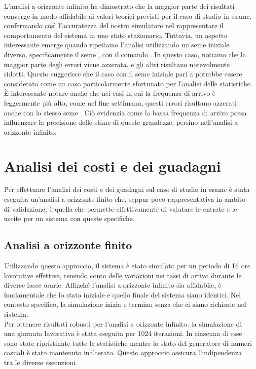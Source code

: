 \documentclass[a4paper, 12pt]{article}
\newcommand{\key}[1]{\texttt{\StrSubstitute{#1}{_}{\_}}}
\begin{document}
L'analisi a orizzonte infinito ha dimostrato che la maggior parte dei risultati converge in modo affidabile ai valori teorici previsti per il caso di studio in esame, confermando così l'accuratezza del nostro simulatore nel rappresentare il comportamento del sistema in uno stato stazionario. Tuttavia, un aspetto interessante emerge quando ripetiamo l'analisi utilizzando un seme iniziale diverso, specificamente il seme \key{12345}, con il comando \key{make clean infinite-weekend SEED=12345}. In questo caso, notiamo che la maggior parte degli errori viene azzerata, e gli altri risultano notevolmente ridotti. Questo suggerisce che il caso con il seme iniziale pari a \key{123} potrebbe essere considerato come un caso particolarmente sfortunato per l'analisi delle statistiche.\\

È interessante notare anche che nei casi in cui la frequenza di arrivo è leggermente più alta, come nel fine settimana, questi errori risultano azzerati anche con lo stesso seme \key{123}. Ciò evidenzia come la bassa frequenza di arrivo possa influenzare la precisione delle stime di queste grandezze, persino nell'analisi a orizzonte infinito. 

\section{Analisi dei costi e dei guadagni}
Per effettuare l'analisi dei costi e dei guadagni sul caso di studio in esame è stata eseguita un'analisi a orizzonte finito che, seppur poco rappresentativa in ambito di validazione, è quella che permette effettivamente di valutare le entrate e le uscite per un sistema con queste specifiche. 

\subsection{Analisi a orizzonte finito}
Utilizzando questo approccio, il sistema è stato simulato per un periodo di 16 ore lavorative effettive, tenendo conto delle variazioni nei tassi di arrivo durante le diverse fasce orarie. Affinché l'analisi a orizzonte infinito sia affidabile, è fondamentale che lo stato iniziale e quello finale del sistema siano identici. Nel contesto specifico, la simulazione inizia e termina senza che ci siano richieste nel sistema.\\

Per ottenere risultati robusti per l'analisi a orizzonte infinito, la simulazione di una giornata lavorativa è stata eseguita per 1024 iterazioni. In ciascuna di esse sono state ripristinate tutte le statistiche mentre lo stato del generatore di numeri casuali è stato mantenuto inalterato. Questo approccio assicura l'indipendenza tra le diverse esecuzioni.\\
\end{document}
